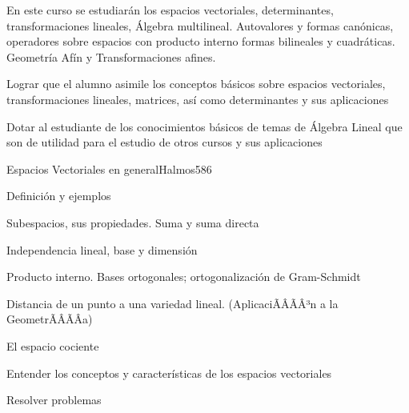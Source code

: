 \begin{sumilla}


\begin{fundamentacion}
En este curso se estudiar\'an los espacios vectoriales, determinantes, transformaciones lineales, \'Algebra multilineal.
Autovalores y formas can\'onicas, operadores sobre espacios con producto interno formas bilineales y cuadr\'aticas. Geometr\'ia Af\'in y Transformaciones afines.
\end{fundamentacion}

\begin{objetivosdelcurso}
\item  Lograr que el alumno asimile los conceptos b\'asicos sobre espacios vectoriales, transformaciones lineales, matrices, as\'i como determinantes y sus aplicaciones
\item  Dotar al estudiante de los conocimientos b\'asicos de temas de \'Algebra Lineal que son de utilidad para el estudio de otros cursos y sus aplicaciones
\end{objetivosdelcurso}

\begin{outcomes}
\end{outcomes}

\begin{unit}{Espacios Vectoriales en general}{Halmos58}{6}
   \begin{topicos}
         \item  Definici\'on y ejemplos
	 \item  Subespacios, sus propiedades. Suma y suma directa
         \item  Independencia lineal, base y dimensi\'on
	 \item  Producto interno. Bases ortogonales; ortogonalizaci\'on de Gram-Schmidt
         \item  Distancia de un punto a una variedad lineal. (AplicaciÃÂÃÂ³n a la GeometrÃÂÃÂ­a)
         \item  El espacio cociente
   \end{topicos}

   \begin{objetivos}
         \item  Entender los conceptos y caracter\'isticas de los espacios vectoriales
         \item  Resolver problemas
   \end{objetivos}
\end{unit}


\end{sumilla}
